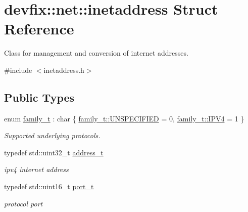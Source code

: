 \hypertarget{structdevfix_1_1net_1_1inetaddress}{}\section{devfix\+:\+:net\+:\+:inetaddress Struct Reference}
\label{structdevfix_1_1net_1_1inetaddress}


Class for management and conversion of internet addresses.  




{\ttfamily \#include $<$inetaddress.\+h$>$}

\subsection*{Public Types}
\begin{DoxyCompactItemize}
\item 
enum \hyperlink{structdevfix_1_1net_1_1inetaddress_a1c470962b4c9c675d475dba2344b50f4}{family\+\_\+t} \+: char \{ \hyperlink{structdevfix_1_1net_1_1inetaddress_a1c470962b4c9c675d475dba2344b50f4a1c04cc3823d476c3017238679a0fdf52}{family\+\_\+t\+::\+U\+N\+S\+P\+E\+C\+I\+F\+I\+ED} = 0, 
\hyperlink{structdevfix_1_1net_1_1inetaddress_a1c470962b4c9c675d475dba2344b50f4ae638ca944d27f97f46a5986a5aa53434}{family\+\_\+t\+::\+I\+P\+V4} = 1
 \}\begin{DoxyCompactList}\small\item\em Supported underlying protocols. \end{DoxyCompactList}
\item 
typedef std\+::uint32\+\_\+t \hyperlink{structdevfix_1_1net_1_1inetaddress_a2eb252de4b894131be8fcda68118bd77}{address\+\_\+t}
\begin{DoxyCompactList}\small\item\em ipv4 internet address \end{DoxyCompactList}\item 
typedef std\+::uint16\+\_\+t \hyperlink{structdevfix_1_1net_1_1inetaddress_a3eaadc730f2b4625987cf948ea485410}{port\+\_\+t}
\begin{DoxyCompactList}\small\item\em protocol port \end{DoxyCompactList}\end{DoxyCompactItemize}
